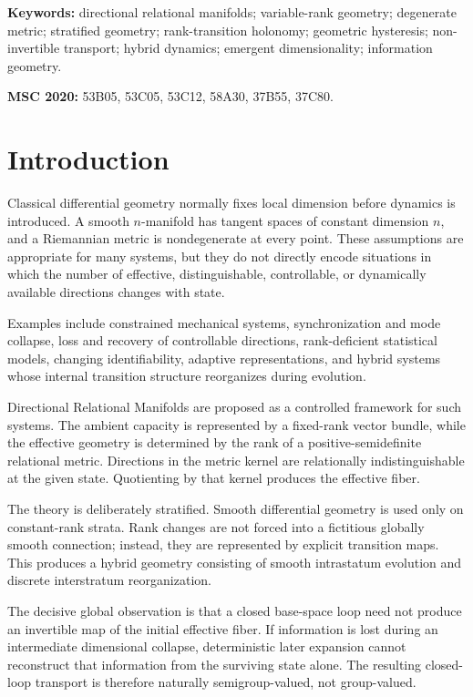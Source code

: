 \documentclass[11pt]{article}
\begin{document}
\medskip
\noindent\textbf{Keywords:}
directional relational manifolds; variable-rank geometry; degenerate metric;
stratified geometry; rank-transition holonomy; geometric hysteresis;
non-invertible transport; hybrid dynamics; emergent dimensionality;
information geometry.

\medskip
\noindent\textbf{MSC 2020:}
53B05, 53C05, 53C12, 58A30, 37B55, 37C80.

\section{Introduction}

Classical differential geometry normally fixes local dimension before
dynamics is introduced. A smooth $n$-manifold has tangent spaces of constant
dimension $n$, and a Riemannian metric is nondegenerate at every point. These
assumptions are appropriate for many systems, but they do not directly encode
situations in which the number of effective, distinguishable, controllable,
or dynamically available directions changes with state.

Examples include constrained mechanical systems, synchronization and mode
collapse, loss and recovery of controllable directions, rank-deficient
statistical models, changing identifiability, adaptive representations, and
hybrid systems whose internal transition structure reorganizes during
evolution.

Directional Relational Manifolds are proposed as a controlled framework for
such systems. The ambient capacity is represented by a fixed-rank vector
bundle, while the effective geometry is determined by the rank of a
positive-semidefinite relational metric. Directions in the metric kernel are
relationally indistinguishable at the given state. Quotienting by that kernel
produces the effective fiber.

The theory is deliberately stratified. Smooth differential geometry is used
only on constant-rank strata. Rank changes are not forced into a fictitious
globally smooth connection; instead, they are represented by explicit
transition maps. This produces a hybrid geometry consisting of smooth
intrastatum evolution and discrete interstratum reorganization.

The decisive global observation is that a closed base-space loop need not
produce an invertible map of the initial effective fiber. If information is
lost during an intermediate dimensional collapse, deterministic later
expansion cannot reconstruct that information from the surviving state alone.
The resulting closed-loop transport is therefore naturally semigroup-valued,
not group-valued.
\end{document}
